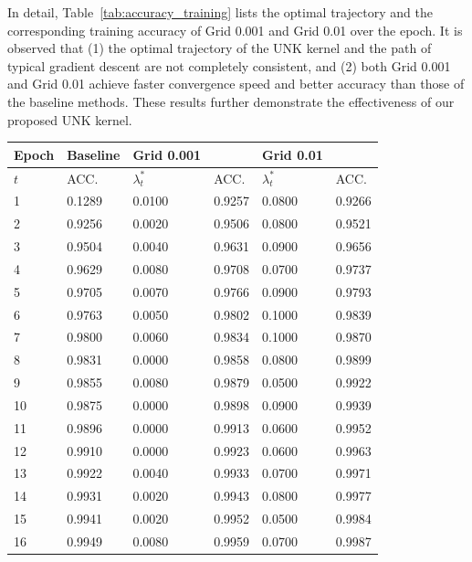 \documentclass[review,10pt]{JMtemplate}
\begin{document}
In detail, Table~\ref{tab:accuracy_training} lists the optimal trajectory and the corresponding training accuracy of Grid 0.001 and Grid 0.01 over the epoch. It is observed that (1) the optimal trajectory of the UNK kernel and the path of typical gradient descent are not completely consistent, and (2) both Grid 0.001 and Grid 0.01 achieve faster convergence speed and better accuracy than those of the baseline methods. These results further demonstrate the effectiveness of our proposed UNK kernel. 


\begin{table}[!htb]
\centering
\begin{tabular}{l|l|ll|ll}
    \toprule
        Epoch & Baseline & Grid 0.001 & ~ & Grid 0.01 & ~ \\ \hline
        $t$ & ACC. & $\lambda^*_t$ & ACC. & $\lambda^*_t$ & ACC. \\
        \hline
        1  & 0.1289  & 0.0100  & 0.9257  & 0.0800  & 0.9266  \\ 
        2  & 0.9256  & 0.0020  & 0.9506  & 0.0800  & 0.9521  \\ 
        3  & 0.9504  & 0.0040  & 0.9631  & 0.0900  & 0.9656  \\ 
        4  & 0.9629  & 0.0080  & 0.9708  & 0.0700  & 0.9737  \\ 
        5  & 0.9705  & 0.0070  & 0.9766  & 0.0900  & 0.9793  \\ 
        6  & 0.9763  & 0.0050  & 0.9802  & 0.1000  & 0.9839  \\ 
        7  & 0.9800  & 0.0060  & 0.9834  & 0.1000  & 0.9870  \\ 
        8  & 0.9831  & 0.0000  & 0.9858  & 0.0800  & 0.9899  \\ 
        9  & 0.9855  & 0.0080  & 0.9879  & 0.0500  & 0.9922  \\ 
        10  & 0.9875  & 0.0000  & 0.9898  & 0.0900  & 0.9939  \\ 
        11  & 0.9896  & 0.0000  & 0.9913  & 0.0600  & 0.9952  \\ 
        12  & 0.9910  & 0.0000  & 0.9923  & 0.0600  & 0.9963  \\ 
        13  & 0.9922  & 0.0040  & 0.9933  & 0.0700  & 0.9971  \\ 
        14  & 0.9931  & 0.0020  & 0.9943  & 0.0800  & 0.9977  \\ 
        15  & 0.9941  & 0.0020  & 0.9952  & 0.0500  & 0.9984  \\ 
        16  & 0.9949  & 0.0080  & 0.9959  & 0.0700  & 0.9987  \\ 

\end{tabular}
\end{table}
\end{document}

